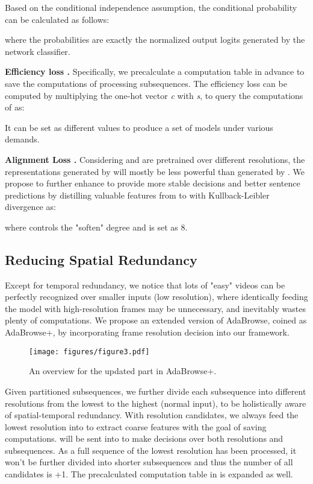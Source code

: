 \documentclass[sigconf]{acmart}
\begin{document}
Based on the conditional independence assumption, the conditional probability  can be calculated as follows: 

where the probabilities are exactly the normalized output logits generated by the network classifier.

\textbf{Efficiency loss .} Specifically, we precalculate a computation table  in advance to save the computations of processing  subsequences. The efficiency loss  can be computed by multiplying the one-hot vector \textit{c} with \textit{s}, to query the computations of as:
  
It can be set as different values to produce a set of models under various demands.
  
\textbf{Alignment Loss .} Considering  and  are pretrained over different resolutions, the representations  generated by  will mostly be less powerful than  generated by . We propose  to further enhance  to provide more stable decisions  and better sentence predictions  by distilling valuable features from  to  with Kullback-Leibler divergence as:
  
where  controls the "soften" degree and is set as 8.
  
\subsection{Reducing Spatial Redundancy}
Except for temporal redundancy, we notice that lots of "easy" videos can be perfectly recognized over smaller inputs (low resolution), where identically feeding the model with high-resolution frames may be unnecessary, and inevitably wastes plenty of computations. We propose an extended version of AdaBrowse, coined as AdaBrowse+, by incorporating frame resolution decision into our framework.
  
  \begin{figure}[t]
    \centering
    \texttt{[image: figures/figure3.pdf]} 
    \caption{An overview for the updated part in AdaBrowse+.}
    \label{fig3}
  \end{figure}
 
Given partitioned subsequences, we further divide each subsequence into  different resolutions from the lowest to the highest (normal input), to be holistically aware of spatial-temporal redundancy. With  resolution candidates, we always feed the lowest resolution into  to extract coarse features  with the goal of saving computations.  will be sent into  to make decisions over both resolutions and subsequences. As a full sequence of the lowest resolution has been processed, it won't be further divided into shorter subsequences and thus the number of all candidates is +1. The precalculated computation table  in  is expanded as well.
\end{document}
